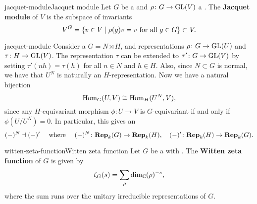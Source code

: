 \begin{topic}{jacquet-module}{Jacquet module}
    Let $G$ be a  and $\rho \colon G \to \textup{GL}(V)$ a . The \textbf{Jacquet module} of $V$ is the subspace of invariants
    \[ V^G = \{ v \in V \mid \rho(g) v = v \textup{ for all } g \in G \} \subset V . \]
\end{topic}

\begin{example}{jacquet-module}
    Consider a  $G = N \rtimes H$, and representations $\rho \colon G \to \textup{GL}(U)$ and $\tau \colon H \to \textup{GL}(V)$. The representation $\tau$ can be extended to $\tau' \colon G \to \textup{GL}(V)$ by setting $\tau'(nh) = \tau(h)$ for all $n \in N$ and $h \in H$. Also, since $N \subset G$ is normal, we have that $U^N$ is naturally an $H$-representation. Now we have a natural bijection
    \[ \operatorname{Hom}_G(U, V) \cong \operatorname{Hom}_H(U^N, V) , \]
    since any $H$-equivariant morphism $\phi \colon U \to V$ is $G$-equivariant if and only if $\phi(U/U^N) = 0$. In particular, this gives an 
    \[ (-)^N \dashv (-)' \quad \textup{ where } \quad (-)^N \colon \textbf{Rep}_k(G) \to \textbf{Rep}_k(H), \quad (-)' \colon \textbf{Rep}_k(H) \to \textbf{Rep}_k(G) . \]
\end{example}

\begin{topic}{witten-zeta-function}{Witten zeta function}
    Let $G$ be a   with  . The \textbf{Witten zeta function} of $G$ is given by
    \[ \zeta_G(s) = \sum_{\rho} \dim_{\mathbb{C}} (\rho)^{-s} , \]
    where the sum runs over the unitary irreducible representations of $G$.
\end{topic}

